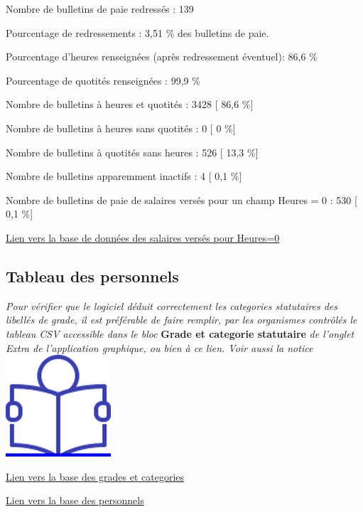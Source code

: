 Nombre de bulletins de paie redressés : 139

Pourcentage de redressements : 3,51 \% des bulletins de paie.

Pourcentage d'heures renseignées (après redressement éventuel): 86,6 \%

Pourcentage de quotités renseignées : 99,9 \%

Nombre de bulletins à heures et quotités : 3428 {[} 86,6 \%{]}

Nombre de bulletins à heures sans quotités : 0 {[} 0 \%{]}

Nombre de bulletins à quotités sans heures : 526 {[} 13,3 \%{]}

Nombre de bulletins apparemment inactifs : 4 {[} 0,1 \%{]}

Nombre de bulletins de paie de salaires versés pour un champ Heures = 0
: 530 {[} 0,1 \%{]}

\href{../Bases/Fiabilite/base.heures.nulles.salaire.nonnull.csv}{Lien vers
la base de données des salaires versés pour Heures=0}

\hypertarget{tableau-des-personnels}{%
\subsection{Tableau des personnels}\label{tableau-des-personnels}}

\emph{Pour vérifier que le logiciel déduit correctement les categories
statutaires des libellés de grade, il est préférable de faire remplir,
par les organismes contrôlés le tableau CSV accessible dans le bloc}
\textbf{Grade et categorie statutaire} \emph{de l'onglet Extra de
l'application graphique, ou bien à ce lien. Voir aussi la notice} ~
\href{../Docs/Notices/fiche_tableau_categories.odt}{\includegraphics{icones/Notice.png}}

\href{../Bases/Effectifs/grades.categories.csv}{Lien vers la base des
grades et categories}

\href{../Bases/Effectifs/matricules.csv}{Lien vers la base des personnels}
